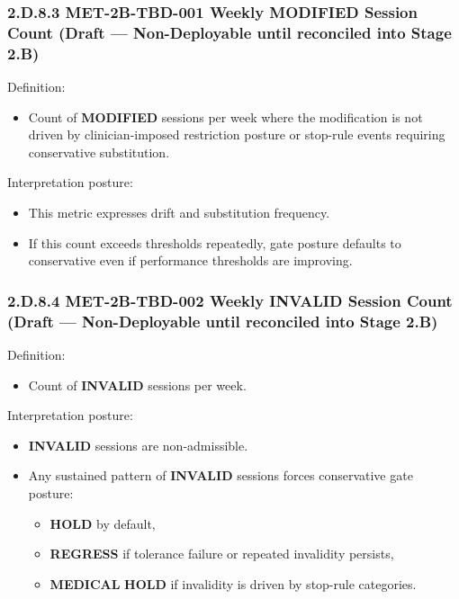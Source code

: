 \documentclass[10pt]{article}
\begin{document}
\subsubsection*{2.D.8.3 \textbf{MET-2B-TBD-001} Weekly \textbf{MODIFIED} Session Count (Draft — Non-Deployable until reconciled into Stage 2.B)}

Definition:

\begin{itemize}
\item Count of \textbf{MODIFIED} sessions per week where the modification is not driven by clinician-imposed restriction posture or stop-rule events requiring conservative substitution.
\end{itemize}

Interpretation posture:

\begin{itemize}
\item This metric expresses drift and substitution frequency.
\item If this count exceeds thresholds repeatedly, gate posture defaults to conservative even if performance thresholds are improving.
\end{itemize}

\subsubsection*{2.D.8.4 \textbf{MET-2B-TBD-002} Weekly \textbf{INVALID} Session Count (Draft — Non-Deployable until reconciled into Stage 2.B)}

Definition:

\begin{itemize}
\item Count of \textbf{INVALID} sessions per week.
\end{itemize}

Interpretation posture:

\begin{itemize}
\item \textbf{INVALID} sessions are non-admissible.
\item Any sustained pattern of \textbf{INVALID} sessions forces conservative gate posture:
  \begin{itemize}
  \item \textbf{HOLD} by default,
  \item \textbf{REGRESS} if tolerance failure or repeated invalidity persists,
  \item \textbf{MEDICAL} \textbf{HOLD} if invalidity is driven by stop-rule categories.
  \end{itemize}
\end{itemize}
\end{document}
